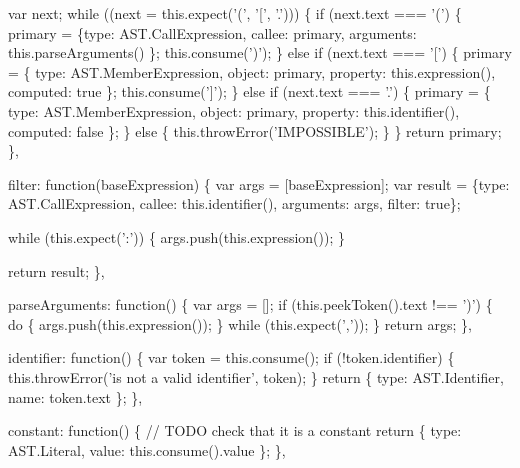 \begin{DoxyCodeInclude}
{{{    var next;
    \textcolor{keywordflow}{while} ((next = this.expect(\textcolor{charliteral}{'('}, \textcolor{charliteral}{'['}, \textcolor{charliteral}{'.'}))) \{
      \textcolor{keywordflow}{if} (next.text === \textcolor{charliteral}{'('}) \{
        primary = \{type: AST.CallExpression, callee: primary, arguments: this.parseArguments() \};
        this.consume(\textcolor{charliteral}{')'});
      \} \textcolor{keywordflow}{else} \textcolor{keywordflow}{if} (next.text === \textcolor{charliteral}{'['}) \{
        primary = \{ type: AST.MemberExpression, \textcolor{keywordtype}{object}: primary, property: this.expression(), computed: \textcolor{keyword}{
      true} \};
        this.consume(\textcolor{charliteral}{']'});
      \} \textcolor{keywordflow}{else} \textcolor{keywordflow}{if} (next.text === \textcolor{charliteral}{'.'}) \{
        primary = \{ type: AST.MemberExpression, \textcolor{keywordtype}{object}: primary, property: this.identifier(), computed: \textcolor{keyword}{
      false} \};
      \} \textcolor{keywordflow}{else} \{
        this.throwError(\textcolor{stringliteral}{'IMPOSSIBLE'});
      \}
    \}
    \textcolor{keywordflow}{return} primary;
  \},

  filter: \textcolor{keyword}{function}(baseExpression) \{
    var args = [baseExpression];
    var result = \{type: AST.CallExpression, callee: this.identifier(), arguments: args, filter: \textcolor{keyword}{true}\};

    \textcolor{keywordflow}{while} (this.expect(\textcolor{charliteral}{':'})) \{
      args.push(this.expression());
    \}

    \textcolor{keywordflow}{return} result;
  \},

  parseArguments: \textcolor{keyword}{function}() \{
    var args = [];
    \textcolor{keywordflow}{if} (this.peekToken().text !== \textcolor{charliteral}{')'}) \{
      \textcolor{keywordflow}{do} \{
        args.push(this.expression());
      \} \textcolor{keywordflow}{while} (this.expect(\textcolor{charliteral}{','}));
    \}
    \textcolor{keywordflow}{return} args;
  \},

  identifier: \textcolor{keyword}{function}() \{
    var token = this.consume();
    \textcolor{keywordflow}{if} (!token.identifier) \{
      this.throwError(\textcolor{stringliteral}{'is not a valid identifier'}, token);
    \}
    \textcolor{keywordflow}{return} \{ type: AST.Identifier, name: token.text \};
  \},

  constant: \textcolor{keyword}{function}() \{
    \textcolor{comment}{// TODO check that it is a constant}
    \textcolor{keywordflow}{return} \{ type: AST.Literal, value: this.consume().value \};
  \},

}}}
\end{DoxyCodeInclude}
